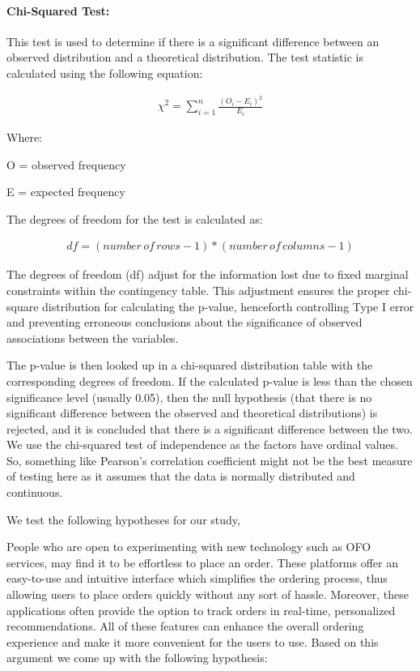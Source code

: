 \documentclass[a4paper,fleqn]{cas-sc}
\begin{document}
\paragraph{Chi-Squared Test:} This test is used to determine if there is a significant difference between an observed distribution and a theoretical distribution. The test statistic is calculated using the following equation:

\begin{align}
    \chi^2 = \sum_{i=1}^{n} \frac{(O_i - E_i)^2}{E_i}
\end{align}

Where:

O = observed frequency

E = expected frequency
\hfill \break

The degrees of freedom for the test is calculated as:

\begin{align}
df = (number \,of \,rows - 1) * (number \,of \,columns - 1)
\end{align}

The degrees of freedom (df) adjust for the information lost due to fixed marginal constraints within the contingency table. This adjustment ensures the proper chi-square distribution for calculating the p-value, henceforth controlling Type I error and preventing erroneous conclusions about the significance of observed associations between the variables.

The p-value is then looked up in a chi-squared distribution table with the corresponding degrees of freedom. If the calculated p-value is less than the chosen significance level (usually 0.05), then the null hypothesis (that there is no significant difference between the observed and theoretical distributions) is rejected, and it is concluded that there is a significant difference between the two. We use the chi-squared test of independence as the factors have ordinal values. So, something like Pearson’s correlation coefficient might not be the best measure of testing here as it assumes that the data is normally distributed and continuous. 

We test the following hypotheses for our study, 

People who are open to experimenting with new technology such as OFO services, may find it to be effortless to place an order. These platforms offer an easy-to-use and intuitive interface which simplifies the ordering process, thus allowing users to place orders quickly without any sort of hassle. Moreover, these applications often provide the option to track orders in real-time, personalized recommendations. All of these features can enhance the overall ordering experience and make it more convenient for the users to use. Based on this argument we come up with the following hypothesis: 
\end{document}
